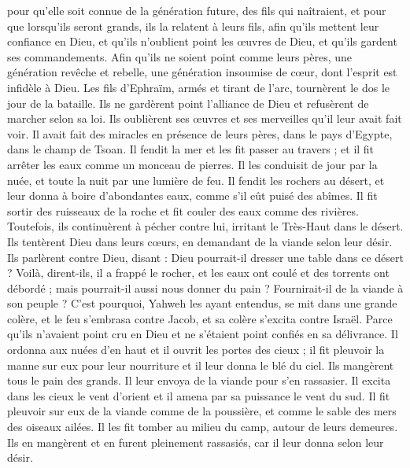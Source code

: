 \begin{multicols}{2}
pour qu'elle soit connue de la génération future, des fils qui naîtraient, et pour que lorsqu'ils seront grands, ils la relatent à leurs fils,
afin qu'ils mettent leur confiance en Dieu, et qu'ils n'oublient point les œuvres de Dieu, et qu'ils gardent ses commandements.
Afin qu'ils ne soient point comme leurs pères, une génération revêche et rebelle, une génération insoumise de cœur, dont l'esprit est infidèle à Dieu.
Les fils d'Ephraïm, armés et tirant de l'arc, tournèrent le dos le jour de la bataille.
Ils ne gardèrent point l'alliance de Dieu et refusèrent de marcher selon sa loi.
Ils oublièrent ses œuvres et ses merveilles qu'il leur avait fait voir.
Il avait fait des miracles en présence de leurs pères, dans le pays d'Egypte, dans le champ de Tsoan.
Il fendit la mer et les fit passer au travers ; et il fit arrêter les eaux comme un monceau de pierres.
Il les conduisit de jour par la nuée, et toute la nuit par une lumière de feu.
Il fendit les rochers au désert, et leur donna à boire d'abondantes eaux, comme s'il eût puisé des abîmes.
Il fit sortir des ruisseaux de la roche et fit couler des eaux comme des rivières.
Toutefois, ils continuèrent à pécher contre lui, irritant le Très-Haut dans le désert.
Ils tentèrent Dieu dans leurs cœurs, en demandant de la viande selon leur désir.
Ils parlèrent contre Dieu, disant : Dieu pourrait-il dresser une table dans ce désert ?
Voilà, dirent-ils, il a frappé le rocher, et les eaux ont coulé et des torrents ont débordé ; mais pourrait-il aussi nous donner du pain ? Fournirait-il de la viande à son peuple ?
C'est pourquoi, Yahweh les ayant entendus, se mit dans une grande colère, et le feu s'embrasa contre Jacob, et sa colère s'excita contre Israël.
Parce qu'ils n'avaient point cru en Dieu et ne s'étaient point confiés en sa délivrance.
Il ordonna aux nuées d'en haut et il ouvrit les portes des cieux ;
il fit pleuvoir la manne sur eux pour leur nourriture et il leur donna le blé du ciel.
Ils mangèrent tous le pain des grands. Il leur envoya de la viande pour s'en rassasier.
Il excita dans les cieux le vent d'orient et il amena par sa puissance le vent du sud.
Il fit pleuvoir sur eux de la viande comme de la poussière, et comme le sable des mers des oiseaux ailées.
Il les fit tomber au milieu du camp, autour de leurs demeures.
Ils en mangèrent et en furent pleinement rassasiés, car il leur donna selon leur désir.

\end{multicols}
